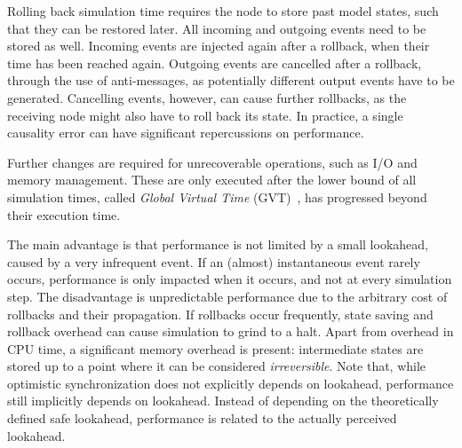 Rolling back simulation time requires the node to store past model states, such that they can be restored later.
All incoming and outgoing events need to be stored as well.
Incoming events are injected again after a rollback, when their time has been reached again.
Outgoing events are cancelled after a rollback, through the use of anti-messages, as potentially different output events have to be generated.
Cancelling events, however, can cause further rollbacks, as the receiving node might also have to roll back its state.
In practice, a single causality error can have significant repercussions on performance.

Further changes are required for unrecoverable operations, such as I/O and memory management.
These are only executed after the lower bound of all simulation times, called \textit{Global Virtual Time} (GVT)~\cite{FujimotoBook}, has progressed beyond their execution time.

The main advantage is that performance is not limited by a small lookahead, caused by a very infrequent event.
If an (almost) instantaneous event rarely occurs, performance is only impacted when it occurs, and not at every simulation step.
The disadvantage is unpredictable performance due to the arbitrary cost of rollbacks and their propagation.
If rollbacks occur frequently, state saving and rollback overhead can cause simulation to grind to a halt.
Apart from overhead in CPU time, a significant memory overhead is present: intermediate states are stored up to a point where it can be considered \textit{irreversible}.
Note that, while optimistic synchronization does not explicitly depends on lookahead, performance still implicitly depends on lookahead.
Instead of depending on the theoretically defined safe lookahead, performance is related to the actually perceived lookahead.
